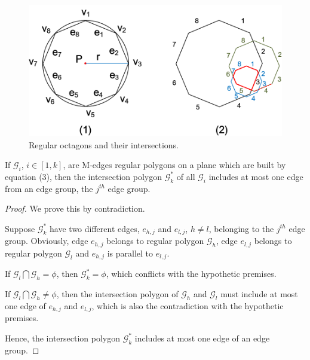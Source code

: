 \begin{figure}[tb!]
\centering
\includegraphics[scale=0.88]{figures/Fig-polygons.png}
\vspace{-1ex}
\caption{\small Regular octagons and their intersections.}
\vspace{-2ex}
\label{fig:polygons}
\end{figure}



\begin{theorem}
\label{prop-rp-intersection}
If $\mathcal{G}_i$, $i \in [1, k]$, are M-edges regular polygons on a plane which are built by equation (3), then the intersection polygon
$\mathcal{G}^*_k$ of all $\mathcal{G}_i$ includes at most one edge from an edge group, \eg the $j^{th}$ edge group.
\end{theorem}


\begin{proof}
We prove this by contradiction.

Suppose $\mathcal{G}^*_k$ have two different edges, $e_{h,j}$ and $e_{l,j}$, $h\ne l$, belonging to the $j^{th}$ edge group. Obviously, edge
$e_{h,j}$ belongs to regular polygon $\mathcal{G}_h$, edge $e_{l,j}$ belongs to regular polygon $\mathcal{G}_l$ and $e_{h,j}$ is parallel to
$e_{l,j}$.

If $\mathcal{G}_l \bigcap \mathcal{G}_h = \phi$, then $\mathcal{G}^*_k=\phi$, which conflicts with the hypothetic premises.

If $\mathcal{G}_l \bigcap \mathcal{G}_h \ne \phi$, then the intersection polygon of $\mathcal{G}_h$ and $\mathcal{G}_l$ must include at most
one edge of $e_{h,j}$ and $e_{l,j}$, which is also the contradiction with the hypothetic premises.

Hence, the intersection polygon $\mathcal{G}^*_k$ includes at most one edge of an edge group.
%
\end{proof}



